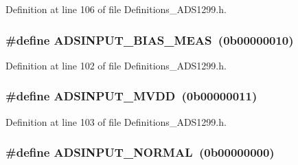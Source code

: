 Definition at line 106 of file Definitions\+\_\+\+A\+D\+S1299.\+h.

\subsubsection[{\texorpdfstring{A\+D\+S\+I\+N\+P\+U\+T\+\_\+\+B\+I\+A\+S\+\_\+\+M\+E\+AS}{ADSINPUT_BIAS_MEAS}}]{\setlength{\rightskip}{0pt plus 5cm}\#define A\+D\+S\+I\+N\+P\+U\+T\+\_\+\+B\+I\+A\+S\+\_\+\+M\+E\+AS~(0b00000010)}\hypertarget{group__Definitions__ADS1299_ga7bab91512236b30be9285da48d5ce360}{}\label{group__Definitions__ADS1299_ga7bab91512236b30be9285da48d5ce360}


Definition at line 102 of file Definitions\+\_\+\+A\+D\+S1299.\+h.

\subsubsection[{\texorpdfstring{A\+D\+S\+I\+N\+P\+U\+T\+\_\+\+M\+V\+DD}{ADSINPUT_MVDD}}]{\setlength{\rightskip}{0pt plus 5cm}\#define A\+D\+S\+I\+N\+P\+U\+T\+\_\+\+M\+V\+DD~(0b00000011)}\hypertarget{group__Definitions__ADS1299_gaca41b0b85d6a23cdf5d528ccb1ddd745}{}\label{group__Definitions__ADS1299_gaca41b0b85d6a23cdf5d528ccb1ddd745}


Definition at line 103 of file Definitions\+\_\+\+A\+D\+S1299.\+h.

\subsubsection[{\texorpdfstring{A\+D\+S\+I\+N\+P\+U\+T\+\_\+\+N\+O\+R\+M\+AL}{ADSINPUT_NORMAL}}]{\setlength{\rightskip}{0pt plus 5cm}\#define A\+D\+S\+I\+N\+P\+U\+T\+\_\+\+N\+O\+R\+M\+AL~(0b00000000)}\hypertarget{group__Definitions__ADS1299_ga79a404120ad83a16e3ae5604e1d574c7}{}\label{group__Definitions__ADS1299_ga79a404120ad83a16e3ae5604e1d574c7}


